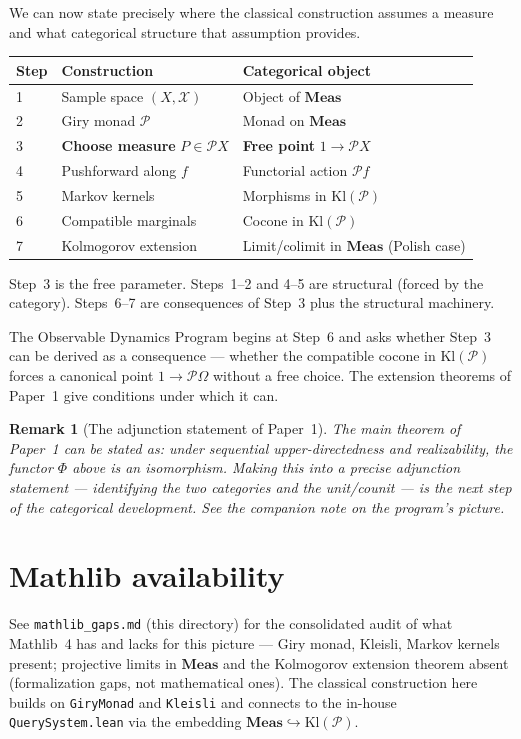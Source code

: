 \documentclass[11pt]{article}
\newtheorem{remark}{Remark}
\newcommand{\Meas}{\mathbf{Meas}}
\newcommand{\Kl}{\mathrm{Kl}}
\newcommand{\Pcal}{\mathcal{P}}
\newcommand{\Xcal}{\mathcal{X}}
\begin{document}
We can now state precisely where the classical construction assumes a measure
and what categorical structure that assumption provides.

\begin{center}
\begin{tabular}{lll}
\hline
Step & Construction & Categorical object \\
\hline
1 & Sample space $(X, \Xcal)$ & Object of $\Meas$ \\
2 & Giry monad $\Pcal$ & Monad on $\Meas$ \\
3 & \textbf{Choose measure} $P \in \Pcal X$ & \textbf{Free point} $1 \to \Pcal X$ \\
4 & Pushforward along $f$ & Functorial action $\Pcal f$ \\
5 & Markov kernels & Morphisms in $\Kl(\Pcal)$ \\
6 & Compatible marginals & Cocone in $\Kl(\Pcal)$ \\
7 & Kolmogorov extension & Limit/colimit in $\Meas$ (Polish case) \\
\hline
\end{tabular}
\end{center}

Step~3 is the free parameter.  Steps~1--2 and 4--5 are structural (forced by
the category).  Steps~6--7 are consequences of Step~3 plus the structural
machinery.

The Observable Dynamics Program begins at Step~6 and asks whether Step~3 can
be derived as a consequence --- whether the compatible cocone in $\Kl(\Pcal)$
forces a canonical point $1 \to \Pcal\Omega$ without a free choice.  The
extension theorems of Paper~1 give conditions under which it can.

\begin{remark}[The adjunction statement of Paper~1]
The main theorem of Paper~1 can be stated as: under sequential
upper-directedness and realizability, the functor $\Phi$ above is an
isomorphism.  Making this into a precise adjunction statement --- identifying
the two categories and the unit/counit --- is the next step of the categorical
development.  See the companion note on the program's picture.
\end{remark}

\section{Mathlib availability}\label{sec:mathlib}

See \texttt{mathlib\_gaps.md} (this directory) for the consolidated audit of
what Mathlib~4 has and lacks for this picture --- Giry monad, Kleisli, Markov
kernels present; projective limits in $\Meas$ and the Kolmogorov extension
theorem absent (formalization gaps, not mathematical ones). The classical
construction here builds on \texttt{GiryMonad} and \texttt{Kleisli} and connects
to the in-house \texttt{QuerySystem.lean} via the embedding $\Meas \hookrightarrow
\Kl(\Pcal)$.
\end{document}
